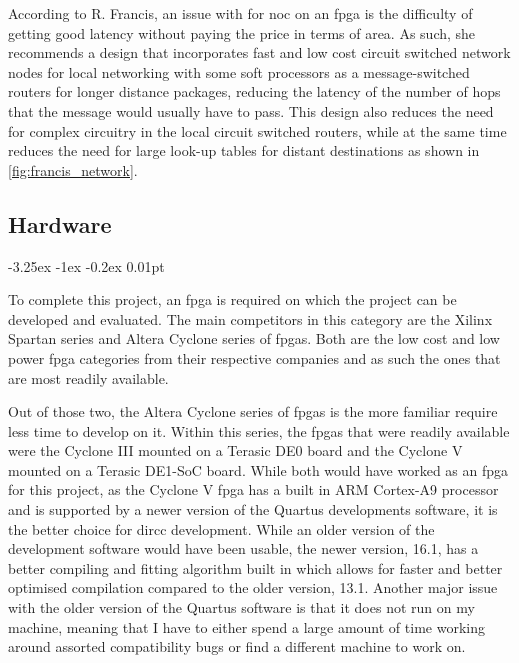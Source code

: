 \documentclass[paper=a4, fontsize=11pt, bibliography=totocnumbered]{scrartcl}
\makeatletter
\renewcommand\paragraph{\@startsection{paragraph}{4}{\z@}%
  {-3.25ex \@plus -1ex \@minus -0.2ex}%
  {0.01pt}%
  {\raggedsection\normalfont\sectfont\nobreak\size@paragraph}%
}
\numberwithin{equation}{section}		%
\numberwithin{figure}{section}			%
\numberwithin{table}{section}				%
\makeatother
\begin{document}
According to R. Francis\cite{rpt:francis2013exploring}, an issue with for \gls{noc} on an \gls{fpga} is the difficulty of getting good latency without paying the price in terms of area. As such, she recommends a design that incorporates fast and low cost circuit switched \glspl{network node} for local networking with some \glspl{soft processor} as a message-switched routers for longer distance packages, reducing the latency of the number of hops that the \gls{message} would usually have to pass. This design also reduces the need for complex circuitry in the local circuit switched routers, while at the same time reduces the need for large look-up tables for distant destinations as shown in \cref{fig:francis_network}.

\subsection{Hardware}

\paragraph{}

To complete this project, an \gls{fpga} is required on which the project can be developed and evaluated. The main competitors in this category are the Xilinx Spartan series and Altera Cyclone series of \glspl{fpga}. Both are the low cost and low power \gls{fpga} categories from their respective companies and as such the ones that are most readily available.

Out of those two, the Altera Cyclone series of \glspl{fpga} is the more familiar require less time to develop on it. Within this series, the \glspl{fpga} that were readily available were the Cyclone III mounted on a Terasic DE0 board\cite{web:terasic_de0} and the Cyclone V mounted on a Terasic DE1-SoC board\cite{web:terasic_de1}. While both would have worked as an \gls{fpga} for this project, as the Cyclone V \gls{fpga} has a built in ARM Cortex-A9 processor and is supported by a newer version of the Quartus developments software, it is the better choice for \gls{dircc} development. While an older version of the development software would have been usable, the newer version, 16.1, has a better compiling and fitting algorithm built in which allows for faster and better optimised compilation compared to the older version, 13.1. Another major issue with the older version of the Quartus software is that it does not run on my machine, meaning that I have to either spend a large amount of time working around assorted compatibility bugs or find a different machine to work on.
\end{document}
